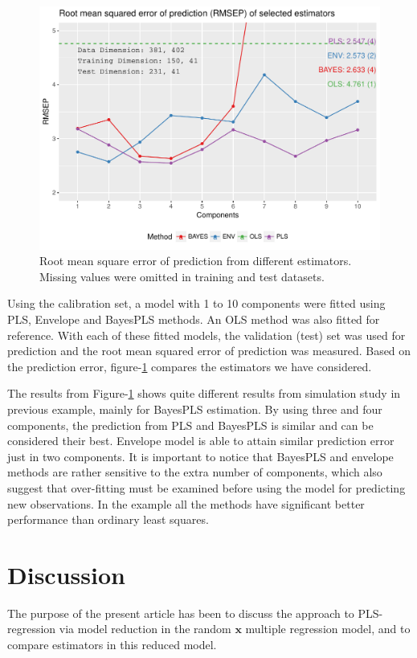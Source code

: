 \documentclass[num-refs]{wiley-article}
\begin{document}
\begin{figure}[!ht]
  \centering
  \includegraphics[width=0.9\linewidth]{prediction-plot-150-train}
  \caption{Root mean square error of prediction from different estimators.
    Missing values were omitted in training and test datasets.}
  \label{fig:ex-2}
\end{figure}

Using the calibration set, a model with 1 to 10 components were fitted using PLS, Envelope and BayesPLS methods. An OLS method was also fitted for reference. With each of these fitted models, the validation (test) set was used for prediction and the root mean squared error of prediction was measured. Based on the prediction error, figure-\ref{fig:ex-2} compares the estimators we have considered. 

The results from Figure-\ref{fig:ex-2} shows quite different results from simulation study in previous example, mainly for BayesPLS estimation. By using three and four components, the prediction from PLS and BayesPLS is similar and can be considered their best. Envelope model is able to attain similar prediction error just in two components. It is important to notice that BayesPLS and envelope methods are rather sensitive to the extra number of components, which also suggest that over-fitting must be examined before using the model for predicting new observations. In the example all the methods have significant better performance than ordinary least squares.

\section{Discussion}

The purpose of the present article has been to discuss the approach to PLS-regression via model reduction in the random $\bm{x}$ multiple regression model, and to compare estimators in this reduced model.
\end{document}
